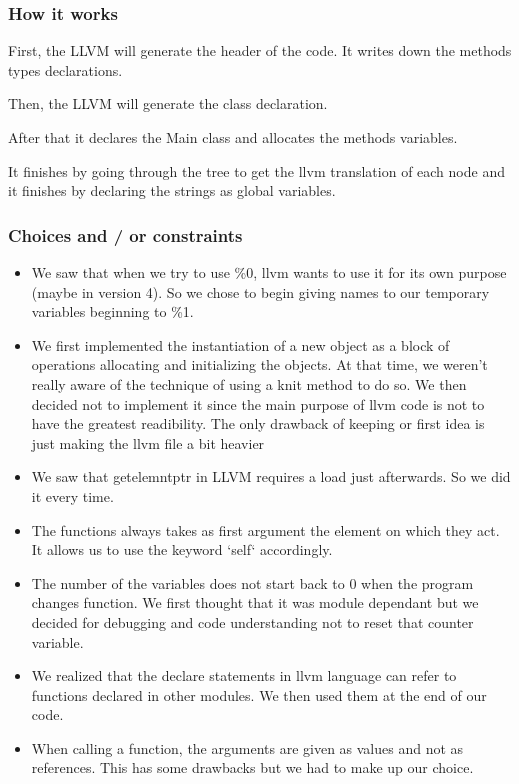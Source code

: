\documentclass[a4paper,11pt]{article}
\begin{document}
    \subsubsection{How it works}
    First, the LLVM will generate the header of the code. It writes down the methods types declarations. 

    Then, the LLVM will generate the class declaration.

    After that it declares the Main class and allocates the methods variables.

    It finishes by going through the tree to get the llvm translation of each node and it finishes by declaring the strings as global variables.
  \subsubsection{Choices and / or constraints}
    \begin{itemize}
    \item We saw that when we try to use \%0, llvm wants to use it for its own purpose (maybe in version 4). So we chose to begin
    giving names to our temporary variables beginning to \%1.
    \item We first implemented the instantiation of a new object as a block of operations allocating and initializing the objects. 
    At that time, we weren't really aware of the technique of using a knit method to do so. We then decided not to implement it
    since the main purpose of llvm code is not to have the greatest readibility. The only drawback of keeping or first idea is just making the llvm file a bit heavier
    \item We saw that getelemntptr in LLVM requires a load just afterwards. So we did it every time.
    \item The functions always takes as first argument the element on which they act. It allows us to use the keyword `self` accordingly.
    \item The number of the variables does not start back to 0 when the program changes function.
    We first thought that it was module dependant but we decided for debugging and code understanding not to reset that counter variable.
    \item We realized that the declare statements in llvm language can refer to functions declared in other modules. We then used them at the end of our code.
    \item When calling a function, the arguments are given as values and not as references. This has some drawbacks but we had to make up our choice.
    \end{itemize}
\end{document}
